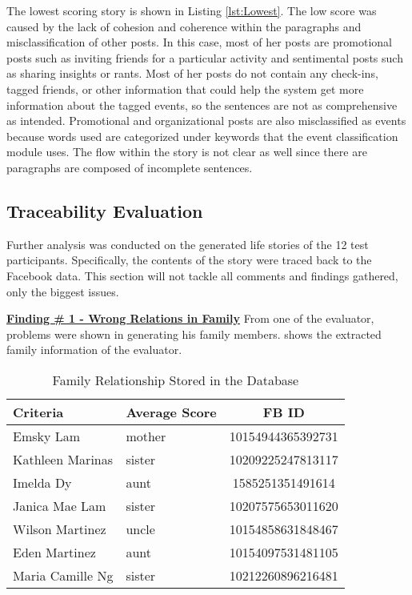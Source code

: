 The lowest scoring story is shown in Listing \ref{lst:Lowest}. The low score was caused by the lack of cohesion and coherence within the paragraphs and misclassification of other posts. In this case, most of her posts are promotional posts such as inviting friends for a particular activity and sentimental posts such as sharing insights or rants. Most of her posts do not contain any check-ins, tagged friends, or other information that could help the system get more information about the tagged events, so the sentences are not as comprehensive as intended. Promotional and organizational posts are also misclassified as events because words used are categorized under keywords that the event classification module uses. The flow within the story is not clear as well since there are paragraphs are composed of incomplete sentences.

\subsection{Traceability Evaluation}
Further analysis was conducted on the generated life stories of the 12 test participants. Specifically, the contents of the story were traced back to the Facebook data. This section will not tackle all comments and findings gathered, only the biggest issues.

\underline{\textbf{Finding \# 1 - Wrong Relations in Family}}
From one of the evaluator, problems were shown in generating his family members.  shows the extracted family information of the evaluator.

\begin{table}[ph!]   %
	\centering
	\caption{Family Relationship Stored in the Database} \vspace{0.25em}
	\begin{tabular}{|p{1in}|p{1in}|c|} \hline
		\centering Criteria & Average Score & FB ID \\ \hline
		Emsky Lam & mother & 10154944365392731 \\ \hline
		Kathleen Marinas & sister & 10209225247813117 \\ \hline
		Imelda Dy & aunt & 1585251351491614 \\ \hline
		Janica Mae Lam & sister & 10207575653011620 \\ \hline
		Wilson Martinez & uncle & 10154858631848467 \\ \hline
		Eden Martinez & aunt & 10154097531481105 \\ \hline
		Maria Camille Ng & sister & 10212260896216481 \\ \hline
	\end{tabular}
	\label{tab:familyrel}
\end{table}

